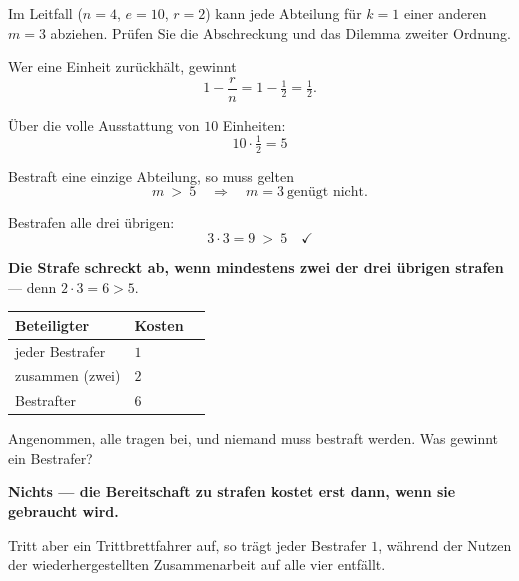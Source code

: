 \begin{aufgabe}
Im Leitfall ($n=4$, $e=10$, $r=2$) kann jede Abteilung für $k=1$ einer anderen $m=3$ abziehen. Prüfen Sie die Abschreckung und das Dilemma zweiter Ordnung.

\loesung
{}
Wer eine Einheit zurückhält, gewinnt
\[ 1 - \frac{r}{n} = 1-\tfrac12 = \tfrac12 . \]

Über die volle Ausstattung von $10$ Einheiten:
\[ 10\cdot\tfrac12 = 5 \]

Bestraft eine einzige Abteilung, so muss gelten
\[ m \ >\ 5 \quad\Longrightarrow\quad m = 3 \ \text{genügt nicht.} \]

Bestrafen alle drei übrigen:
\[ 3\cdot3 = 9 \ >\ 5 \quad \checkmark \]

\begin{center}
\begin{minipage}{0.9\textwidth}
\textbf{Die Strafe schreckt ab, wenn mindestens zwei der drei übrigen strafen} --- denn $2\cdot3 = 6 > 5$.
\end{minipage}
\end{center}

\begin{center}
\renewcommand{\arraystretch}{1.48}
\begin{tabular}{@{}P{2.6cm}P{2.2cm}P{2.6cm}@{}}
\toprule
\textbf{Beteiligter} & \textbf{Kosten} & \\
\midrule
jeder Bestrafer & $1$ & \\
zusammen (zwei) & $2$ & \\
Bestrafter & $6$ & \\
\bottomrule
\end{tabular}
\end{center}

Angenommen, alle tragen bei, und niemand muss bestraft werden. Was gewinnt ein Bestrafer?

\begin{center}
\begin{minipage}{0.9\textwidth}
\textbf{Nichts --- die Bereitschaft zu strafen kostet erst dann, wenn sie gebraucht wird.}
\end{minipage}
\end{center}

Tritt aber ein Trittbrettfahrer auf, so trägt jeder Bestrafer $1$, während der Nutzen der wiederhergestellten Zusammenarbeit auf alle vier entfällt.


\end{aufgabe}
